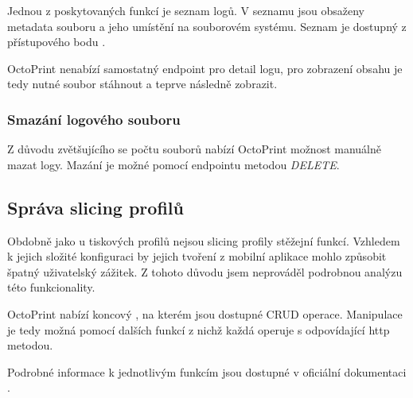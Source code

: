 Jednou z poskytovaných funkcí je seznam logů.
V seznamu jsou obsaženy metadata souboru a jeho umístění na souborovém systému.
Seznam je dostupný z přístupového bodu .

OctoPrint nenabízí samostatný endpoint pro detail logu, pro zobrazení obsahu je tedy nutné soubor stáhnout a teprve následně zobrazit.

\subsubsection*{Smazání logového souboru}

Z důvodu zvětšujícího se počtu souborů nabízí OctoPrint možnost manuálně mazat logy.
Mazání je možné pomocí endpointu  metodou \textit{DELETE}.

\subsection{Správa slicing profilů}

Obdobně jako u tiskových profilů nejsou slicing profily stěžejní funkcí.
Vzhledem k jejich složité konfiguraci by jejich tvoření z mobilní aplikace mohlo způsobit špatný uživatelský zážitek.
Z tohoto důvodu jsem neprováděl podrobnou analýzu této funkcionality.

OctoPrint nabízí koncový , na kterém jsou dostupné CRUD operace.
Manipulace je tedy možná pomocí dalších funkcí z nichž každá operuje s odpovídající \acrshort{http} metodou.

Podrobné informace k jednotlivým funkcím jsou dostupné v oficiální dokumentaci \cite{octoprint-docs-slicing}.
